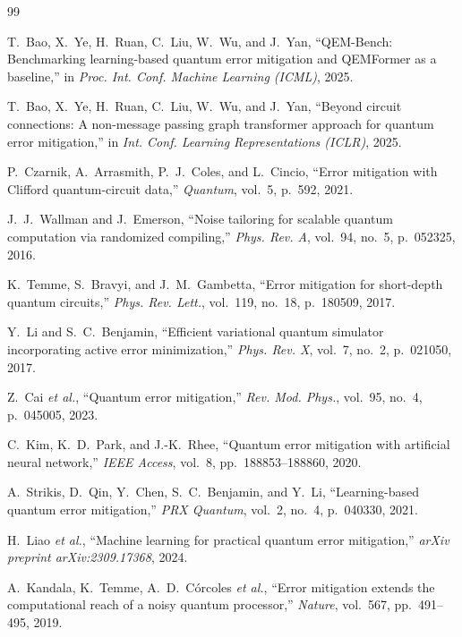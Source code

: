 \documentclass[11pt, a4paper]{article}
\begin{document}

\begin{thebibliography}{99}

T.~Bao, X.~Ye, H.~Ruan, C.~Liu, W.~Wu, and J.~Yan,
``QEM-Bench: Benchmarking learning-based quantum error mitigation and
QEMFormer as a baseline,''
in \emph{Proc. Int. Conf. Machine Learning (ICML)}, 2025.

T.~Bao, X.~Ye, H.~Ruan, C.~Liu, W.~Wu, and J.~Yan,
``Beyond circuit connections: A non-message passing graph transformer approach
for quantum error mitigation,''
in \emph{Int. Conf. Learning Representations (ICLR)}, 2025.

P.~Czarnik, A.~Arrasmith, P.~J.~Coles, and L.~Cincio,
``Error mitigation with Clifford quantum-circuit data,''
\emph{Quantum}, vol.~5, p.~592, 2021.

J.~J.~Wallman and J.~Emerson,
``Noise tailoring for scalable quantum computation via randomized compiling,''
\emph{Phys. Rev. A}, vol.~94, no.~5, p.~052325, 2016.

K.~Temme, S.~Bravyi, and J.~M.~Gambetta,
``Error mitigation for short-depth quantum circuits,''
\emph{Phys. Rev. Lett.}, vol.~119, no.~18, p.~180509, 2017.

Y.~Li and S.~C.~Benjamin,
``Efficient variational quantum simulator incorporating active error
minimization,''
\emph{Phys. Rev. X}, vol.~7, no.~2, p.~021050, 2017.

Z.~Cai \emph{et al.},
``Quantum error mitigation,''
\emph{Rev. Mod. Phys.}, vol.~95, no.~4, p.~045005, 2023.

C.~Kim, K.~D.~Park, and J.-K.~Rhee,
``Quantum error mitigation with artificial neural network,''
\emph{IEEE Access}, vol.~8, pp.~188853--188860, 2020.

A.~Strikis, D.~Qin, Y.~Chen, S.~C.~Benjamin, and Y.~Li,
``Learning-based quantum error mitigation,''
\emph{PRX Quantum}, vol.~2, no.~4, p.~040330, 2021.

H.~Liao \emph{et al.},
``Machine learning for practical quantum error mitigation,''
\emph{arXiv preprint arXiv:2309.17368}, 2024.

A.~Kandala, K.~Temme, A.~D.~C{\'o}rcoles \emph{et al.},
``Error mitigation extends the computational reach of a noisy quantum
processor,''
\emph{Nature}, vol.~567, pp.~491--495, 2019.

\end{thebibliography}
\end{document}
